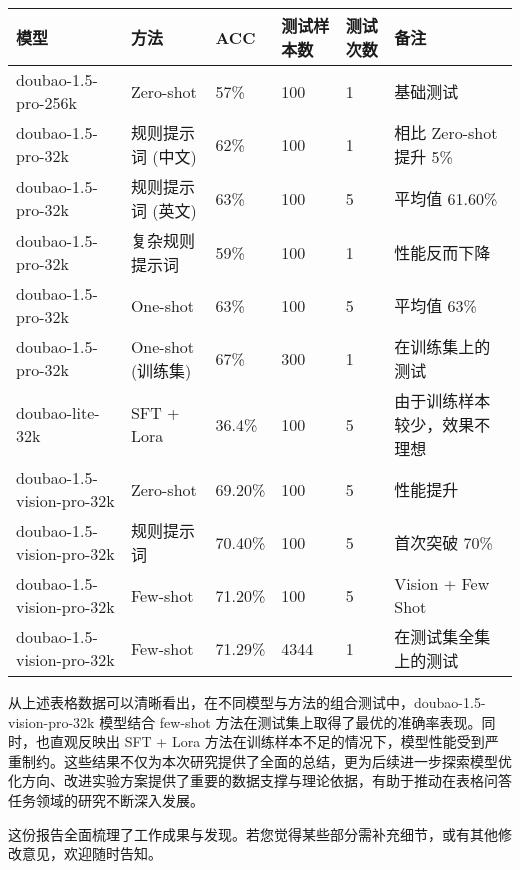 \documentclass[12pt,a4paper]{ctexart}
\begin{document}
\begin{longtable}{|p{3cm}|p{3cm}|p{1.5cm}|p{1.5cm}|p{1.5cm}|p{3cm}|}
\hline
\textbf{模型} & \textbf{方法} & \textbf{ACC} & \textbf{测试样本数} & \textbf{测试次数} & \textbf{备注} \\ \hline

doubao-1.5-pro-256k & Zero-shot & 57\% & 100 & 1 & 基础测试 \\ \hline
doubao-1.5-pro-32k & 规则提示词 (中文) & 62\% & 100 & 1 & 相比 Zero-shot 提升 5\% \\ \hline
doubao-1.5-pro-32k & 规则提示词 (英文) & 63\% & 100 & 5 & 平均值 61.60\% \\ \hline
doubao-1.5-pro-32k & 复杂规则提示词 & 59\% & 100 & 1 & 性能反而下降 \\ \hline
doubao-1.5-pro-32k & One-shot & 63\% & 100 & 5 & 平均值 63\% \\ \hline
doubao-1.5-pro-32k & One-shot (训练集) & 67\% & 300 & 1 & 在训练集上的测试 \\ \hline
doubao-lite-32k & SFT + Lora & 36.4\% & 100 & 5 & 由于训练样本较少，效果不理想 \\ \hline
doubao-1.5-vision-pro-32k & Zero-shot & 69.20\% & 100 & 5 & 性能提升 \\ \hline
doubao-1.5-vision-pro-32k & 规则提示词 & 70.40\% & 100 & 5 & 首次突破 70\% \\ \hline
doubao-1.5-vision-pro-32k & Few-shot & 71.20\% & 100 & 5 & Vision + Few Shot \\ \hline
doubao-1.5-vision-pro-32k & Few-shot & 71.29\% & 4344 & 1 & 在测试集全集上的测试 \\ \hline
\end{longtable}

从上述表格数据可以清晰看出，在不同模型与方法的组合测试中，doubao-1.5-vision-pro-32k 模型结合 few-shot 方法在测试集上取得了最优的准确率表现。同时，也直观反映出 SFT + Lora 方法在训练样本不足的情况下，模型性能受到严重制约。这些结果不仅为本次研究提供了全面的总结，更为后续进一步探索模型优化方向、改进实验方案提供了重要的数据支撑与理论依据，有助于推动在表格问答任务领域的研究不断深入发展。

这份报告全面梳理了工作成果与发现。若您觉得某些部分需补充细节，或有其他修改意见，欢迎随时告知。
\end{document}
